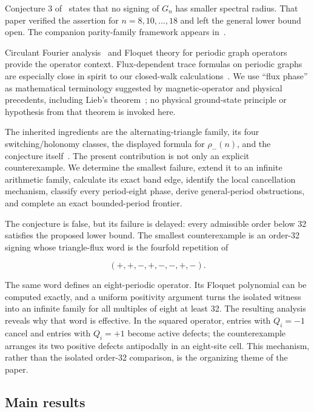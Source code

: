 Conjecture 3 of~\cite{Suvagiya2026Signed} states that no signing of \(G_n\) has
smaller spectral radius. That paper verified the assertion for
\(n=8,10,\ldots,18\) and left the general lower bound open. The companion
parity-family framework appears in~\cite{Suvagiya2026Parity}.

Circulant Fourier analysis~\cite{Davis1979} and Floquet theory for periodic
graph operators~\cite{Kuchment1993,KorotyaevSaburova2017} provide the operator
context. Flux-dependent trace formulas on periodic graphs are especially close
in spirit to our closed-walk calculations~\cite{KorotyaevSaburova2023}. We use
``flux phase'' as mathematical terminology suggested by magnetic-operator and
physical precedents, including Lieb's theorem~\cite{Lieb1994}; no physical
ground-state principle or hypothesis from that theorem is invoked here.

The inherited ingredients are the alternating-triangle family, its four
switching/holonomy classes, the displayed formula for \(\rho_-(n)\), and the
conjecture itself~\cite{Suvagiya2026Signed}. The present contribution is not
only an explicit counterexample. We determine the smallest failure, extend it to
an infinite arithmetic family, calculate its exact band edge, identify the
local cancellation mechanism, classify every period-eight phase, derive
general-period obstructions, and complete an exact bounded-period frontier.

The conjecture is false, but its failure is delayed: every admissible
order below 32 satisfies the proposed lower bound. The smallest counterexample is
an order-32 signing whose triangle-flux word is the fourfold repetition of

\begin{equation}
(+,+,-,+,-,-,+,-).
\end{equation}

The same word defines an eight-periodic operator. Its Floquet polynomial can be
computed exactly, and a uniform positivity argument turns the isolated witness
into an infinite family for all multiples of eight at least 32. The resulting
analysis reveals why that word is effective. In the squared operator, entries
with \(Q_i=-1\) cancel and entries with \(Q_i=+1\) become active defects; the
counterexample arranges its two positive defects antipodally in an eight-site
cell. This mechanism, rather than the isolated order-32 comparison, is the
organizing theme of the paper.

\subsection{Main results}

